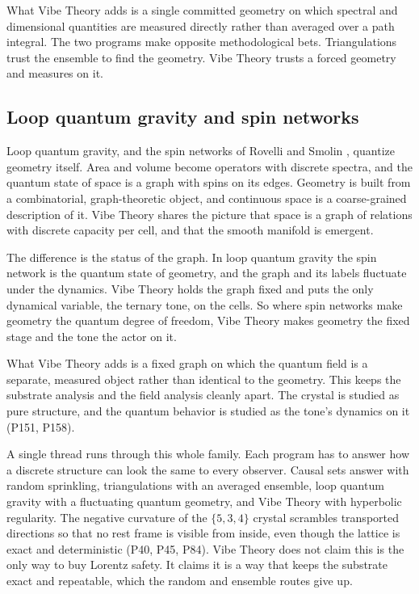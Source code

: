 What Vibe Theory adds is a single committed geometry on which spectral and dimensional quantities are measured
directly rather than averaged over a path integral. The two programs make opposite methodological bets.
Triangulations trust the ensemble to find the geometry. Vibe Theory trusts a forced geometry and measures
on it.

\subsection{Loop quantum gravity and spin networks}

Loop quantum gravity, and the spin networks of Rovelli and Smolin \cite{rovelli1995}, quantize geometry
itself. Area and volume become operators with discrete spectra, and the quantum state of space is a graph
with spins on its edges. Geometry is built from a combinatorial, graph-theoretic object, and continuous
space is a coarse-grained description of it. Vibe Theory shares the picture that space is a graph of relations
with discrete capacity per cell, and that the smooth manifold is emergent.

The difference is the status of the graph. In loop quantum gravity the spin network is the quantum state of
geometry, and the graph and its labels fluctuate under the dynamics. Vibe Theory holds the graph fixed and
puts the only dynamical variable, the ternary tone, on the cells. So where spin networks make geometry the
quantum degree of freedom, Vibe Theory makes geometry the fixed stage and the tone the actor on it.

What Vibe Theory adds is a fixed graph on which the quantum field is a separate, measured object rather than
identical to the geometry. This keeps the substrate analysis and the field analysis cleanly apart. The crystal
is studied as pure structure, and the quantum behavior is studied as the tone's dynamics on it (P151, P158).

A single thread runs through this whole family. Each program has to answer how a discrete structure can look
the same to every observer. Causal sets answer with random sprinkling, triangulations with an averaged
ensemble, loop quantum gravity with a fluctuating quantum geometry, and Vibe Theory with hyperbolic
regularity. The negative curvature of the $\{5,3,4\}$ crystal scrambles transported directions so that no rest
frame is visible from inside, even though the lattice is exact and deterministic (P40, P45, P84). Vibe Theory
does not claim this is the only way to buy Lorentz safety. It claims it is a way that keeps the substrate exact
and repeatable, which the random and ensemble routes give up.

